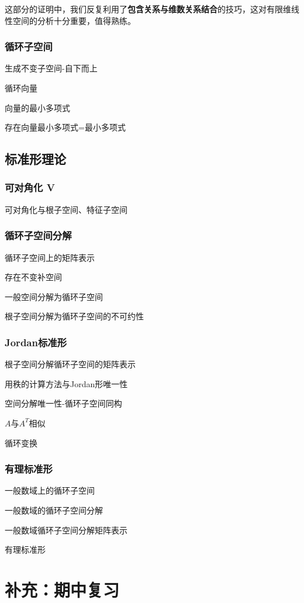 \documentclass[a4paper,UTF8,fontset=windows,AutoFakeBold]{ctexart}
\newcommand*{\note}{\noindent *}
\begin{document}
\note 这部分的证明中，我们反复利用了\textbf{包含关系与维数关系结合}的技巧，这对有限维线性空间的分析十分重要，值得熟练。

\subsubsection{循环子空间}
生成不变子空间-自下而上

循环向量

向量的最小多项式

存在向量最小多项式=最小多项式


\subsection{标准形理论}
\subsubsection{可对角化 V}
可对角化与根子空间、特征子空间

\subsubsection{循环子空间分解}
循环子空间上的矩阵表示

存在不变补空间

一般空间分解为循环子空间

根子空间分解为循环子空间的不可约性

\subsubsection{Jordan标准形}
根子空间分解循环子空间的矩阵表示

用秩的计算方法与Jordan形唯一性

空间分解唯一性-循环子空间同构

$A$与$A^T$相似

循环变换

\subsubsection{有理标准形}
一般数域上的循环子空间

一般数域的循环子空间分解

一般数域循环子空间分解矩阵表示

有理标准形

\section{补充：期中复习}
\end{document}
